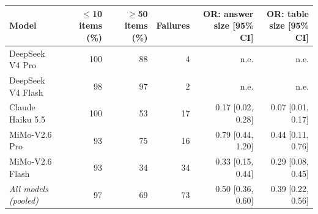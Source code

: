 \begin{tabular}{lrrrrr}
\toprule
Model & $\leq$10 items (\%) & $\geq$50 items (\%) & Failures & OR: answer size [95\% CI] & OR: table size [95\% CI] \\
\midrule
DeepSeek V4 Pro & 100 & 88 & 4 & n.e. & n.e. \\
DeepSeek V4 Flash & 98 & 97 & 2 & n.e. & n.e. \\
Claude Haiku 5.5 & 100 & 53 & 17 & 0.17 [0.02, 0.28] & 0.07 [0.01, 0.17] \\
MiMo-V2.6 Pro & 93 & 75 & 16 & 0.79 [0.44, 1.20] & 0.44 [0.11, 0.76] \\
MiMo-V2.6 Flash & 93 & 34 & 34 & 0.33 [0.15, 0.44] & 0.29 [0.08, 0.45] \\
\midrule
\textit{All models (pooled)} & 97 & 69 & 73 & 0.50 [0.36, 0.60] & 0.39 [0.22, 0.56] \\
\bottomrule
\end{tabular}
